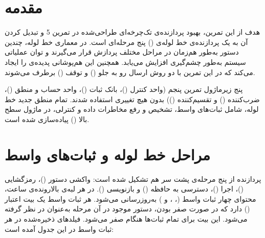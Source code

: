\section{مقدمه}
هدف از این تمرین، بهبود پردازنده‌ی تک‌چرخه‌ای طراحی‌شده در تمرین 5 و تبدیل کردن آن به یک پردازنده‌ی خط لوله‌ی () پنج مرحله‌ای است. در معماری خط لوله، چندین دستور به‌طور هم‌زمان در مراحل مختلف پردازش قرار می‌گیرند و توان عملیاتی سیستم به‌طور چشم‌گیری افزایش می‌یابد. همچنین این هم‌پوشانی پدیده‌‌ی  را ایجاد می‌کند که در این تمرین با دو روش ارسال رو به جلو () و توقف () برطرف می‌شوند.

پنج زیرماژول تمرین پنجم (واحد کنترل ()، بانک ثبات ()، واحد حساب و منطق ()، ضرب‌کننده () و تقسیم‌کننده ()) بدون هیچ تغییری استفاده شدند. تمام منطق جدید خط لوله، شامل ثبات‌های واسط، تشخیص و رفع مخاطرات داده و کنترلی، در ماژول سطح بالا () پیاده‌سازی شده است.

\section{مراحل خط لوله و ثبات‌های واسط}
پردازنده از پنج مرحله‌ی پشت سر هم تشکیل شده است: واکشی دستور ()، رمزگشایی ()، اجرا ()، دسترسی به حافظه () و بازنویسی (). در هر لبه‌ی بالارونده‌ی ساعت، محتوای چهار ثبات واسط (، ،  و ) به‌روزرسانی می‌شود. هر ثبات واسط یک بیت اعتبار () دارد که در صورت صفر بودن، دستور موجود در آن مرحله به‌عنوان  در نظر گرفته می‌شود. این بیت برای تمام ثبات‌ها هنگام  صفر می‌شود. فیلدهای ذخیره‌شده در هر ثبات واسط در این جدول آمده است:

